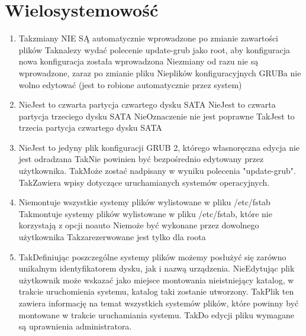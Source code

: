\newpage
\section{Wielosystemowość}
\begin{enumerate}

	\item {}
	{Tak}{zmiany NIE SĄ automatycznie wprowadzone po zmianie zawartości plików}
	{Tak}{nalezy wydać polecenie update-grub jako root, aby konfiguracja nowa konfiguracja została wprowadzona}
	{Nie}{zmiany od razu nie są wprowadzone, zaraz po zmianie pliku}
	{Nie}{plików konfiguracyjnych GRUBa nie wolno edytować (jest to robione automatycznie przez system)}
	
	\item {}
	{Nie}{Jest to czwarta partycja czwartego dysku SATA}
	{Nie}{Jest to czwarta partycja trzeciego dysku SATA}
	{Nie}{Oznaczenie nie jest poprawne}
	{Tak}{Jest to trzecia partycja czwartego dysku SATA}
	
	\item {}
	{Nie}{Jest to jedyny plik konfiguracji GRUB 2, którego własnoręczna edycja nie jest odradzana}
	{Tak}{Nie powinien być bezpośrednio edytowany przez użytkownika.}
	{Tak}{Może zostać nadpisany w wyniku polecenia "update-grub".}
	{Tak}{Zawiera wpisy dotyczące uruchamianych systemów operacyjnych.}
	
	\item {}
	{Nie}{montuje wszystkie systemy plików wylistowane w pliku /etc/fstab}
	{Tak}{montuje systemy plików wylistowane w pliku /etc/fstab, które nie korzystają z opcji noauto}
	{Nie}{może być wykonane przez dowolnego użytkownika}
	{Tak}{zarezerwowane jest tylko dla roota}
	
	\item {}
	{Tak}{Definiując poszczególne systemy plików możemy posłużyć się zarówno unikalnym identyfikatorem dysku, jak i nazwą urządzenia.}
	{Nie}{Edytując plik użytkownik może wskazać jako miejsce montowania nieistniejący katalog, w trakcie uruchomienia systemu, katalog taki zostanie utworzony.}
	{Tak}{Plik ten zawiera informację na temat wszystkich systemów plików, które powinny być montowane w trakcie uruchamiania systemu.}
	{Tak}{Do edycji pliku wymagane są uprawnienia administratora.}
	

\end{enumerate}
